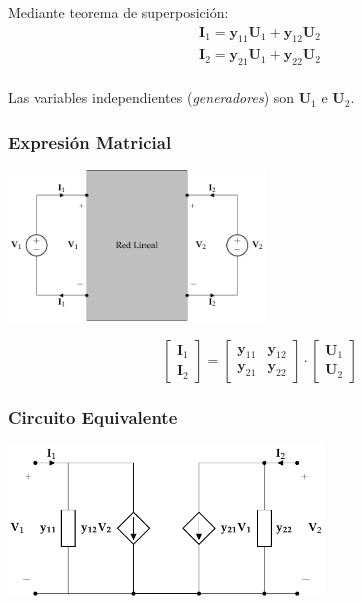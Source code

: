 Mediante teorema de superposición:
\[
\begin{array}{l}
  \mathbf{I}_1 = \mathbf{y}_{11} \mathbf{U}_1 + \mathbf{y}_{12} \mathbf{U}_2\\
  \mathbf{I}_2 = \mathbf{y}_{21} \mathbf{U}_1 + \mathbf{y}_{22} \mathbf{U}_2\\
\end{array}
\]

Las variables independientes (\emph{generadores}) son \(\mathbf{U}_1\) e \(\mathbf{U}_2\).

\subsubsection{Expresión Matricial}
\label{sec:org3731aa9}

\includegraphics[height=4cm]{../figs/cuadripolo_fuentes_tension.pdf}


\[
  \left[
    \begin{array}{c}
      \mathbf{I}_1\\
      \mathbf{I}_2
    \end{array}
  \right] =
  \left[
    \begin{array}{cc}
      \mathbf{y}_{11} & \mathbf{y}_{12}\\
      \mathbf{y}_{21} & \mathbf{y}_{22}
    \end{array}
  \right] \cdot
  \left[
    \begin{array}{c}
      \mathbf{U}_1\\
      \mathbf{U}_2
    \end{array}
  \right]
\]

\subsubsection{Circuito Equivalente}
\label{sec:orgc722f4f}

\includegraphics[height=4cm]{../figs/circuitoEquivalenteY.pdf}


